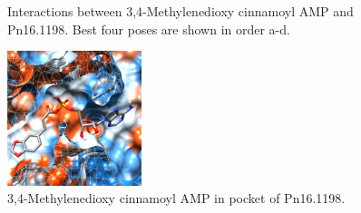 \documentclass[12pt]{article}
\begin{document}
\begin{figure}[h!]
\begin{subfigure}[h!]{0.35\textwidth}
			\caption{}
		\end{subfigure}
		\hfill
		\caption[Interactions between 3,4-Methylenedioxy cinnamoyl AMP and Pn16.1198]{Interactions between 3,4-Methylenedioxy cinnamoyl AMP and Pn16.1198. Best four poses are shown in order a-d.}
		\label{fig6p_3}
	\end{figure}
	\FloatBarrier
	
	
	\FloatBarrier
	\begin{figure}[h!]
		\centering
		\includegraphics[width=0.35\textwidth]{../6/propose/Dock/chimera.png}
		\caption{3,4-Methylenedioxy cinnamoyl AMP in pocket of Pn16.1198.}
		\label{fig6p_4}
	\end{figure}
	\FloatBarrier

	\newpage
	
	
	
	
	\newpage
	\tableofcontents
	\listoffigures
	\listoftables
	
\end{document}
